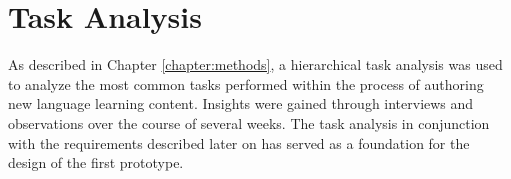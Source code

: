 \section{Task Analysis} \label{section:task-analysis}
As described in Chapter \ref{chapter:methods}, a hierarchical task analysis was used to analyze the most common tasks performed within the process of authoring new language learning content. Insights were gained through interviews and observations over the course of several weeks. The task analysis in conjunction with the requirements described later on has served as a foundation for the design of the first prototype.




